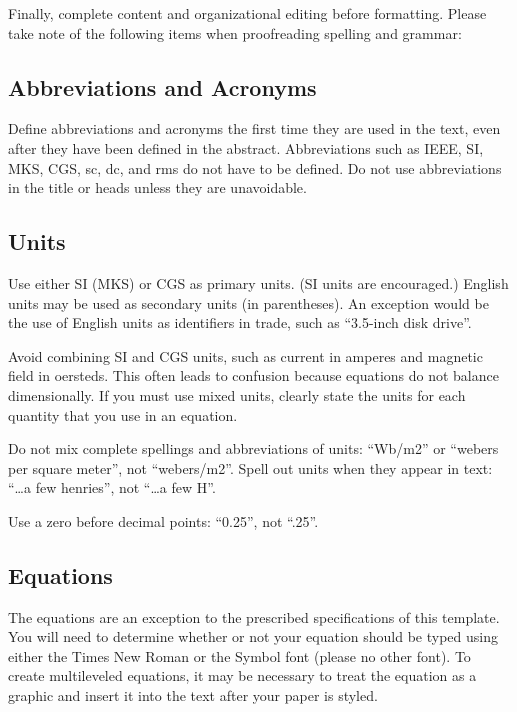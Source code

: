 \documentclass[conference,flushend]{iaria-lite}
\begin{document}
Finally, complete content and organizational editing before formatting. Please take note of the following items when proofreading spelling and grammar:

\subsection{Abbreviations and Acronyms}
Define abbreviations and acronyms the first time they are used in the text, even after they have been defined in the abstract. Abbreviations such as IEEE, SI, MKS, CGS, sc, dc, and rms do not have to be defined. Do not use abbreviations in the title or heads unless they are unavoidable.

\subsection{Units}
\begin{compactitem}
\item Use either SI (MKS) or CGS as primary units. (SI units are encouraged.) English units may be used as secondary units (in parentheses). An exception would be the use of English units as identifiers in trade, such as “3.5-inch disk drive”.
\item Avoid combining SI and CGS units, such as current in amperes and magnetic field in oersteds. This often leads to confusion because equations do not balance dimensionally. If you must use mixed units, clearly state the units for each quantity that you use in an equation.
\item Do not mix complete spellings and abbreviations of units: “Wb/m2” or “webers per square meter”, not “webers/m2”.  Spell out units when they appear in text: “\ldots a few henries”, not “\ldots a few H”.
\item Use a zero before decimal points: “0.25”, not “.25”.
\end{compactitem}

\subsection{Equations}

The equations are an exception to the prescribed specifications of this template. You will need to determine whether or not your equation should be typed using either the Times New Roman or the Symbol font (please no other font). To create multileveled equations, it may be necessary to treat the equation as a graphic and insert it into the text after your paper is styled.
\end{document}
